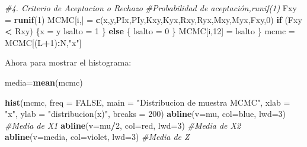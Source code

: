 \documentclass[
]{article}
\newenvironment{Shaded}{\begin{snugshade}}{\end{snugshade}}
\newcommand{\AttributeTok}[1]{\textcolor[rgb]{0.13,0.29,0.53}{#1}}
\newcommand{\CommentTok}[1]{\textcolor[rgb]{0.56,0.35,0.01}{\textit{#1}}}
\newcommand{\ConstantTok}[1]{\textcolor[rgb]{0.56,0.35,0.01}{#1}}
\newcommand{\ControlFlowTok}[1]{\textcolor[rgb]{0.13,0.29,0.53}{\textbf{#1}}}
\newcommand{\DecValTok}[1]{\textcolor[rgb]{0.00,0.00,0.81}{#1}}
\newcommand{\FunctionTok}[1]{\textcolor[rgb]{0.13,0.29,0.53}{\textbf{#1}}}
\newcommand{\NormalTok}[1]{#1}
\newcommand{\OtherTok}[1]{\textcolor[rgb]{0.56,0.35,0.01}{#1}}
\newcommand{\SpecialCharTok}[1]{\textcolor[rgb]{0.81,0.36,0.00}{\textbf{#1}}}
\newcommand{\StringTok}[1]{\textcolor[rgb]{0.31,0.60,0.02}{#1}}
\begin{document}
\begin{Shaded}
\begin{Highlighting}[]
  \CommentTok{\#4. Criterio de Aceptacion o Rechazo}
  \CommentTok{\#Probabilidad de aceptación,runif(1)}
\NormalTok{  Fxy }\OtherTok{=} \FunctionTok{runif}\NormalTok{(}\DecValTok{1}\NormalTok{)}
\NormalTok{  MCMC[i,] }\OtherTok{=} \FunctionTok{c}\NormalTok{(x,y,PIx,PIy,Kxy,Kyx,Rxy,Ryx,Mxy,Myx,Fxy,}\DecValTok{0}\NormalTok{)}
  \ControlFlowTok{if}\NormalTok{ (Fxy }\SpecialCharTok{\textless{}}\NormalTok{ Rxy)}
\NormalTok{  \{x }\OtherTok{=}\NormalTok{ y}
\NormalTok{  lsalto }\OtherTok{=} \DecValTok{1}
\NormalTok{  \}}
  \ControlFlowTok{else}
\NormalTok{  \{ lsalto }\OtherTok{=} \DecValTok{0}
\NormalTok{  \}}
\NormalTok{  MCMC[i,}\DecValTok{12}\NormalTok{] }\OtherTok{=}\NormalTok{ lsalto}
\NormalTok{\}}
\NormalTok{mcmc }\OtherTok{=}\NormalTok{ MCMC[(L}\SpecialCharTok{+}\DecValTok{1}\NormalTok{)}\SpecialCharTok{:}\NormalTok{N,}\StringTok{"x"}\NormalTok{]}
\end{Highlighting}
\end{Shaded}

Ahora para mostrar el histograma:

\begin{Shaded}
\begin{Highlighting}[]
\NormalTok{media}\OtherTok{=}\FunctionTok{mean}\NormalTok{(mcmc)}

\FunctionTok{hist}\NormalTok{(mcmc,}
\AttributeTok{freq =} \ConstantTok{FALSE}\NormalTok{,}
\AttributeTok{main =} \StringTok{"Distribucion de muestra MCMC"}\NormalTok{,}
\AttributeTok{xlab =} \StringTok{"x"}\NormalTok{,}
\AttributeTok{ylab =} \StringTok{"distribucion(x)"}\NormalTok{,}
\AttributeTok{breaks =} \DecValTok{200}\NormalTok{)}
\FunctionTok{abline}\NormalTok{(}\AttributeTok{v=}\NormalTok{mu, }\AttributeTok{col=}\StringTok{\textquotesingle{}blue\textquotesingle{}}\NormalTok{, }\AttributeTok{lwd=}\DecValTok{3}\NormalTok{)      }\CommentTok{\#Media de X1}
\FunctionTok{abline}\NormalTok{(}\AttributeTok{v=}\NormalTok{mu}\SpecialCharTok{/}\DecValTok{2}\NormalTok{, }\AttributeTok{col=}\StringTok{\textquotesingle{}red\textquotesingle{}}\NormalTok{, }\AttributeTok{lwd=}\DecValTok{3}\NormalTok{)     }\CommentTok{\#Media de X2}
\FunctionTok{abline}\NormalTok{(}\AttributeTok{v=}\NormalTok{media, }\AttributeTok{col=}\StringTok{\textquotesingle{}violet\textquotesingle{}}\NormalTok{, }\AttributeTok{lwd=}\DecValTok{3}\NormalTok{) }\CommentTok{\#Media de Z}
\end{Highlighting}
\end{Shaded}
\end{document}
